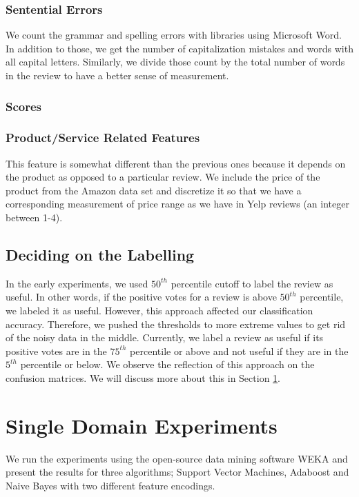 \documentclass[letterpaper]{article}
\begin{document}
\subsubsection{Sentential Errors}
We count the grammar and spelling errors with libraries using
Microsoft Word. In addition to those, we get the number of
capitalization mistakes and words with all capital letters. Similarly, we
divide those count by the total number of words in the review to have
a better sense of measurement.  

\subsubsection{Scores}

\subsubsection{Product/Service Related Features} 
This feature is somewhat different than the previous ones
because it depends on the product as opposed to a particular
review. We include the price of the product from the Amazon data set and
discretize it so that we have a corresponding measurement of price
range as we have in Yelp reviews (an integer between 1-4). 

\subsection{Deciding on the Labelling}
In the early experiments, we used $50^{th}$ percentile cutoff to label the
review as useful. In other words, if the positive votes for a review is above
$50^{th}$ percentile, we labeled it as useful. However, this approach affected our classification
accuracy. Therefore, we pushed the thresholds to more extreme values
to get rid of the noisy data in the middle. Currently, we label a review as useful
if its positive votes are in the $75^{th}$ percentile or above and not
useful if they are 
in the $5^{th}$ percentile or below. We observe the reflection of this
approach on the confusion matrices. We will discuss more about this in
Section \ref{sec:single_domain}.


\section{Single Domain Experiments}
\label{sec:single_domain}  
We run the experiments using the open-source data mining software WEKA \cite{weka}
and present the results for three algorithms; Support Vector Machines, Adaboost and
Naive Bayes with two different feature encodings. 
\end{document}
